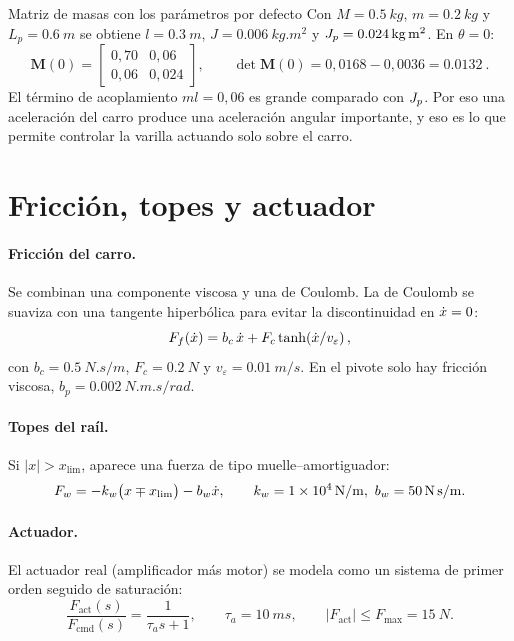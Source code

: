 \begin{ejemplo}{Matriz de masas con los parámetros por defecto}
Con $M=\SI{0.5}{kg}$, $m=\SI{0.2}{kg}$ y $L_p=\SI{0.6}{m}$ se obtiene $l=\SI{0.3}{m}$, $J=\SI{0.006}{kg.m^2}$ y $J_p=\SI{0.024}{kg.m^2}$. En $\theta=0$:
\[
\mathbf{M}(0)=\begin{bmatrix}0{,}70 & 0{,}06\\ 0{,}06 & 0{,}024\end{bmatrix},\qquad
\det\mathbf{M}(0)=0{,}0168-0{,}0036=\SI{0.0132}{}.
\]
El término de acoplamiento $ml=0{,}06$ es grande comparado con $J_p$. Por eso una aceleración del carro produce una aceleración angular importante, y eso es lo que permite controlar la varilla actuando solo sobre el carro.
\end{ejemplo}

\section{Fricción, topes y actuador}

\paragraph{Fricción del carro.} Se combinan una componente viscosa y una de Coulomb. La de Coulomb se suaviza con una tangente hiperbólica para evitar la discontinuidad en $\dot{x}=0$:
\begin{equation}
  F_f(\dot{x}) = b_c\,\dot{x} + F_c\tanh\!\left(\dot{x}/v_\varepsilon\right),
\end{equation}
con $b_c=\SI{0.5}{N.s/m}$, $F_c=\SI{0.2}{N}$ y $v_\varepsilon=\SI{0.01}{m/s}$. En el pivote solo hay fricción viscosa, $b_p=\SI{0.002}{N.m.s/rad}$.

\paragraph{Topes del raíl.} Si $|x|>x_{\lim}$, aparece una fuerza de tipo muelle--amortiguador:
\begin{equation}
  F_w = -k_w\big(x\mp x_{\lim}\big) - b_w\dot{x},\qquad k_w=\SI{1e4}{N/m},\ b_w=\SI{50}{N.s/m}.
\end{equation}

\paragraph{Actuador.} El actuador real (amplificador más motor) se modela como un sistema de primer orden seguido de saturación:
\begin{equation}
  \frac{F_{\text{act}}(s)}{F_{\text{cmd}}(s)} = \frac{1}{\tau_a s+1},\qquad \tau_a=\SI{10}{ms},\qquad |F_{\text{act}}|\le F_{\max}=\SI{15}{N}.
\end{equation}

